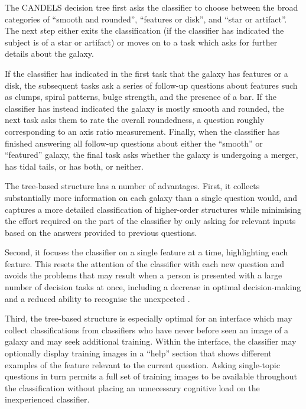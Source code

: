 \documentclass[useAMS,usenatbib]{mn2e}
\begin{document}
{The CANDELS decision tree first asks the classifier to choose between the broad categories of ``smooth and rounded'', ``features or disk'', and ``star or artifact''. The next step either exits the classification (if the classifier has indicated the subject is of a star or artifact) or moves on to a task which asks for further details about the galaxy. 

If the classifier has indicated in the first task that the galaxy has features or a disk, the subsequent tasks ask a series of follow-up questions about features such as clumps, spiral patterns, bulge strength, and the presence of a bar. If the classifier has instead indicated the galaxy is mostly smooth and rounded, the next task asks them to rate the overall roundedness, a question roughly corresponding to an axis ratio measurement. Finally, when the classifier has finished answering all follow-up questions about either the ``smooth'' or ``featured'' galaxy, the final task asks whether the galaxy is undergoing a merger, has tidal tails, or has both, or neither.

The tree-based structure has a number of advantages. First, it collects substantially more information on each galaxy than a single question would, and captures a more detailed classification of higher-order structures while minimising the effort required on the part of the classifier by only asking for relevant inputs based on the answers provided to previous questions. 

Second, it focuses the classifier on a single feature at a time, highlighting each feature. This resets the attention of the classifier with each new question and avoids the problems that may result when a person is presented with a large number of decision tasks at once, including a decrease in optimal decision-making \citep{iyengar00,crescenzi13, besedes15} and a reduced ability to recognise the unexpected \citep{simons99,todd05}. 

Third, the tree-based structure is especially optimal for an interface which may collect classifications from classifiers who have never before seen an image of a galaxy and may seek additional training. Within the interface, the classifier may optionally display training images in a ``help'' section that shows different examples of the feature relevant to the current question. Asking single-topic questions in turn permits a full set of training images to be available throughout the classification without placing an unnecessary cognitive load on the inexperienced classifier.

}
\end{document}
